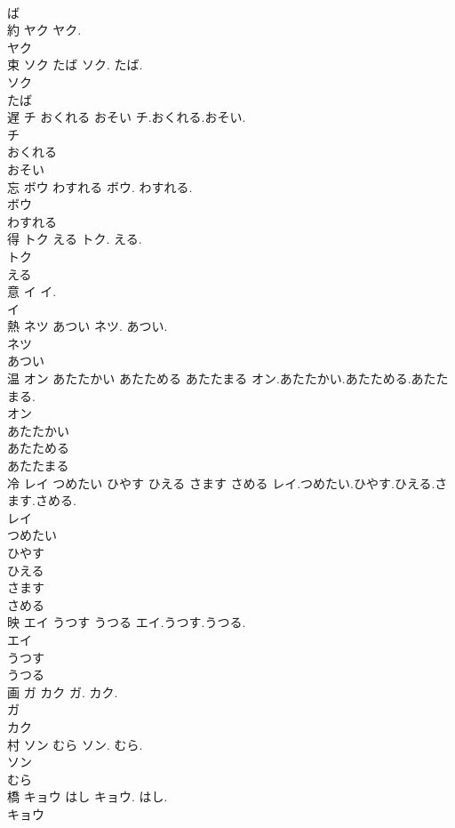 \documentclass[8pt]{extreport}
\begin{document}
\begin{CJK}{UTF8}{min}
\\	ば
\\	約	ヤク	ヤク.	
\\	ヤク
\\	束	ソク たば	ソク. たば.	
\\	ソク
\\	たば
\\	遅	チ おくれる おそい	チ.おくれる.おそい.	
\\	チ
\\	おくれる
\\	おそい
\\	忘	ボウ わすれる	ボウ. わすれる.	
\\	ボウ
\\	わすれる
\\	得	トク える	トク. える.	
\\	トク
\\	える
\\	意	イ	イ.	
\\	イ
\\	熱	ネツ あつい	ネツ. あつい.	
\\	ネツ
\\	あつい
\\	温	オン あたたかい あたためる あたたまる	オン.あたたかい.あたためる.あたたまる.	
\\	オン
\\	あたたかい
\\	あたためる
\\	あたたまる
\\	冷	レイ つめたい ひやす ひえる さます さめる	レイ.つめたい.ひやす.ひえる.さます.さめる.	
\\	レイ
\\	つめたい
\\	ひやす
\\	ひえる
\\	さます
\\	さめる
\\	映	エイ うつす うつる	エイ.うつす.うつる.	
\\	エイ
\\	うつす
\\	うつる
\\	画	ガ カク	ガ. カク.	
\\	ガ
\\	カク
\\	村	ソン むら	ソン. むら.	
\\	ソン
\\	むら
\\	橋	キョウ はし	キョウ. はし.	
\\	キョウ

\end{CJK}
\end{document}
